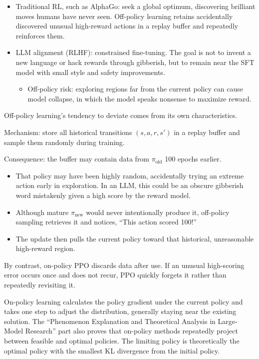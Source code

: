 \begin{itemize}
\tightlist
\item
  Traditional RL, such as AlphaGo: seek a global optimum, discovering brilliant moves humans have never seen. Off-policy learning retains accidentally discovered unusual high-reward actions in a replay buffer and repeatedly reinforces them.
\item
  LLM alignment (RLHF): constrained fine-tuning. The goal is not to invent a new language or hack rewards through gibberish, but to remain near the SFT model with small style and safety improvements.

  \begin{itemize}
  \tightlist
  \item
    Off-policy risk: exploring regions far from the current policy can cause model collapse, in which the model speaks nonsense to maximize reward.
  \end{itemize}
\end{itemize}

Off-policy learning's tendency to deviate comes from its own characteristics.

Mechanism: store all historical transitions \((s,a,r,s')\) in a replay buffer and sample them randomly during training.

Consequence: the buffer may contain data from \(\pi_{\mathrm{old}}\) 100 epochs earlier.

\begin{itemize}
\tightlist
\item
  That policy may have been highly random, accidentally trying an extreme action early in exploration. In an LLM, this could be an obscure gibberish word mistakenly given a high score by the reward model.
\item
  Although mature \(\pi_{\mathrm{new}}\) would never intentionally produce it, off-policy sampling retrieves it and notices, ``This action scored 100!''
\item
  The update then pulls the current policy toward that historical, unreasonable high-reward region.
\end{itemize}

By contrast, on-policy PPO discards data after use. If an unusual high-scoring error occurs once and does not recur, PPO quickly forgets it rather than repeatedly revisiting it.

On-policy learning calculates the policy gradient under the current policy and takes one step to adjust the distribution, generally staying near the existing solution. The ``Phenomenon Explanation and Theoretical Analysis in Large-Model Research'' part also proves that on-policy methods repeatedly project between feasible and optimal policies. The limiting policy is theoretically the optimal policy with the smallest KL divergence from the initial policy.

